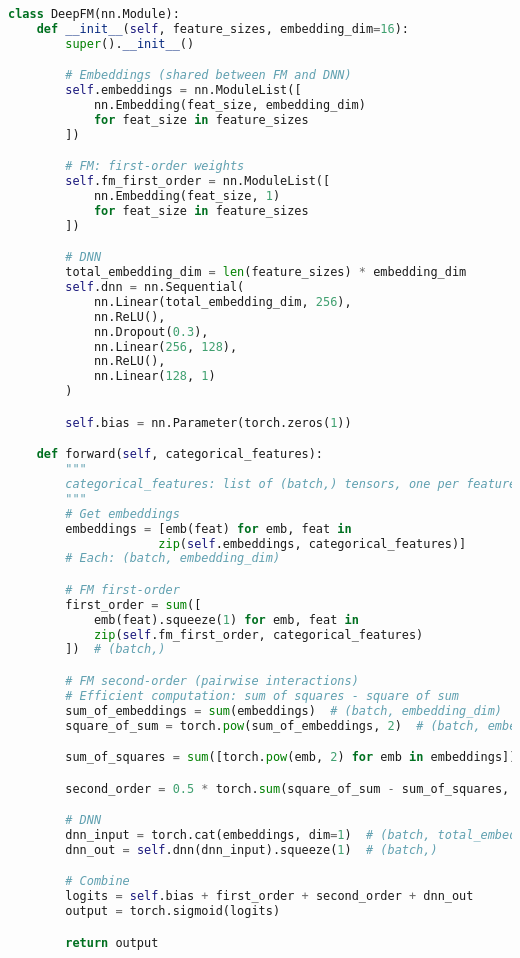 \documentclass[10pt]{article}
\begin{document}
\begin{lstlisting}[language=Python]
class DeepFM(nn.Module):
    def __init__(self, feature_sizes, embedding_dim=16):
        super().__init__()

        # Embeddings (shared between FM and DNN)
        self.embeddings = nn.ModuleList([
            nn.Embedding(feat_size, embedding_dim)
            for feat_size in feature_sizes
        ])

        # FM: first-order weights
        self.fm_first_order = nn.ModuleList([
            nn.Embedding(feat_size, 1)
            for feat_size in feature_sizes
        ])

        # DNN
        total_embedding_dim = len(feature_sizes) * embedding_dim
        self.dnn = nn.Sequential(
            nn.Linear(total_embedding_dim, 256),
            nn.ReLU(),
            nn.Dropout(0.3),
            nn.Linear(256, 128),
            nn.ReLU(),
            nn.Linear(128, 1)
        )

        self.bias = nn.Parameter(torch.zeros(1))

    def forward(self, categorical_features):
        """
        categorical_features: list of (batch,) tensors, one per feature field
        """
        # Get embeddings
        embeddings = [emb(feat) for emb, feat in
                     zip(self.embeddings, categorical_features)]
        # Each: (batch, embedding_dim)

        # FM first-order
        first_order = sum([
            emb(feat).squeeze(1) for emb, feat in
            zip(self.fm_first_order, categorical_features)
        ])  # (batch,)

        # FM second-order (pairwise interactions)
        # Efficient computation: sum of squares - square of sum
        sum_of_embeddings = sum(embeddings)  # (batch, embedding_dim)
        square_of_sum = torch.pow(sum_of_embeddings, 2)  # (batch, embedding_dim)

        sum_of_squares = sum([torch.pow(emb, 2) for emb in embeddings])  # (batch, embedding_dim)

        second_order = 0.5 * torch.sum(square_of_sum - sum_of_squares, dim=1)  # (batch,)

        # DNN
        dnn_input = torch.cat(embeddings, dim=1)  # (batch, total_embedding_dim)
        dnn_out = self.dnn(dnn_input).squeeze(1)  # (batch,)

        # Combine
        logits = self.bias + first_order + second_order + dnn_out
        output = torch.sigmoid(logits)

        return output
\end{lstlisting}
\end{document}
